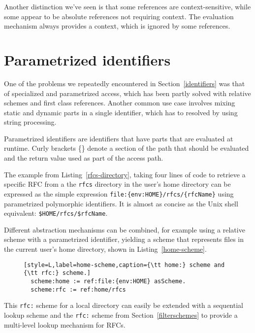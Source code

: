 \documentclass[preprint,authoryear]{llncs}
\begin{document}
Another distinction we've seen is that some references are context-sensitive, while some
appear to be absolute references not requiring context.  The evaluation mechanism always
provides a context, which is ignored by some references.  


\section{Parametrized identifiers}
\label{parametrized}

One of the problems we repeatedly encountered in Section~\ref{identifiers} was 
that of specialized and parametrized access, which has been partly solved with
relative schemes and first class references.  Another common use case involves
mixing static and dynamic parts in a single identifier, which has to resolved by
using string processing.

Parametrized identifiers are identifiers that have parts that are evaluated
at runtime.  Curly brackets \{\} denote a section of the path that should be evaluated and
the return value used as part of the access path.

The example from Listing~\ref{rfcs-directory}, taking four lines of code to retrieve a specific RFC from a 
the {\tt rfcs} directory in the user's home directory can be expressed as the simple expression
{\tt file:\{env:HOME\}/rfcs/\{rfcName\}} using parametrized polymorphic identifiers.  It is almost
as concise as the Unix shell equivalent: {\tt \$HOME/rfcs/\$rfcName}.

Different abstraction mechanisms can be combined, for example using a
relative scheme with a parametrized identifier, yielding
a scheme that represents files in the current user's home directory, shown
in Listing~\ref{home-scheme}.


\begin{figure}[htbp]
\begin{lstlisting}[style=L,label=home-scheme,caption={\tt home:} scheme and {\tt rfc:} scheme.]
  scheme:home := ref:file:{env:HOME} asScheme.
  scheme:rfc := ref:home/rfcs
\end{lstlisting}
\end{figure}

This {\tt rfc:} scheme for a local directory can easily be extended with a sequential lookup scheme
and the {\tt rfc:} scheme from Section~\ref{filterschemes} to provide a multi-level lookup mechanism
for RFCs.

\end{document}
